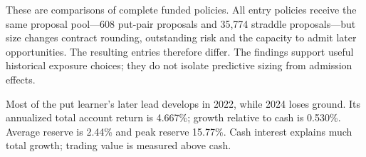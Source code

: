 These are comparisons of complete funded policies. All entry policies receive the same proposal pool---608 put-pair proposals and 35,774 straddle proposals---but size changes contract rounding, outstanding risk and the capacity to admit later opportunities. The resulting entries therefore differ. The findings support useful historical exposure choices; they do not isolate predictive sizing from admission effects.


Most of the put learner's later lead develops in 2022, while 2024 loses ground. Its annualized total account return is 4.667\%; growth relative to cash is 0.530\%. Average reserve is 2.44\% and peak reserve 15.77\%. Cash interest explains much total growth; trading value is measured above cash.

